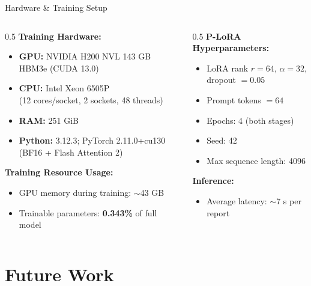 ﻿\documentclass[aspectratio=169]{beamer}
\begin{document}
\begin{frame}{Hardware \& Training Setup}
\begin{columns}[T]
\begin{column}{0.5\textwidth}
\textbf{Training Hardware:}
\begin{itemize}
    \item \textbf{GPU:} NVIDIA H200 NVL 143 GB HBM3e (CUDA 13.0)
    \item \textbf{CPU:} Intel Xeon 6505P\\(12 cores/socket, 2 sockets, 48 threads)
    \item \textbf{RAM:} 251 GiB
    \item \textbf{Python:} 3.12.3; PyTorch 2.11.0+cu130 (BF16 + Flash Attention 2)
\end{itemize}
\vspace{0.5em}
\textbf{Training Resource Usage:}
\begin{itemize}
    \item GPU memory during training: $\sim$43 GB
    \item Trainable parameters: \textbf{0.343\%} of full model
\end{itemize}
\end{column}
\begin{column}{0.5\textwidth}
\textbf{P-LoRA Hyperparameters:}
\begin{itemize}
    \item LoRA rank $r = 64$, $\alpha = 32$, dropout $= 0.05$
    \item Prompt tokens $= 64$
    \item Epochs: 4 (both stages)
    \item Seed: 42
    \item Max sequence length: 4096
\end{itemize}
\vspace{0.5em}
\textbf{Inference:}
\begin{itemize}
    \item Average latency: $\sim$7 s per report
\end{itemize}
\end{column}
\end{columns}
\end{frame}

\section{Future Work}
\end{document}
